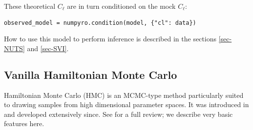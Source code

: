 \documentclass[twocolumn,twocolappendix,nofootinbib,iop]{openjournal}
\newcommand{\nblink}[1]{\href{https://github.com/DifferentiableUniverseInitiative/jax-cosmo-paper/blob/master/notebooks/#1.ipynb}{\faFileCodeO}}
\newcommand{\numpyro}{\texttt{NumPyro}}
\newcommand{\jaxcosmo}{\texttt{jax-cosmo}}
\begin{document}
These theoretical $C_{\ell}$ are in turn conditioned on the mock $C_\ell$:

\begin{lstlisting}[language=iPython]
observed_model = numpyro.condition(model, {"cl": data})
\end{lstlisting}


%
%
How to use this model to perform inference is described in the sections \ref{sec-NUTS} and \ref{sec-SVI}. %
%
\subsection{Vanilla Hamiltonian Monte Carlo}
%
Hamiltonian Monte Carlo (HMC) is an MCMC-type method particularly suited to drawing
samples from high dimensional parameter spaces.  It was introduced in \citep{1987PhLB..195..216D}
and developed extensively since.  See \citet{betancourt} for a full review; we describe
very basic features here.
\end{document}
